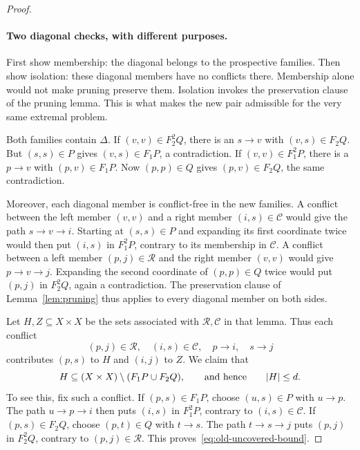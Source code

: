 \begin{proof}
\paragraph{Two diagonal checks, with different purposes.}
First show membership: the diagonal belongs to the prospective families.
Then show isolation: these diagonal members have no conflicts there.
Membership alone would not make pruning preserve them. Isolation invokes
the preservation clause of the pruning lemma. This is what makes the new
pair admissible for the very same extremal problem.

Both families contain $\Delta$.  If $(v,v)\in F_2^2Q$, there is an $s\to v$
with $(v,s)\in F_2Q$.  But $(s,s)\in P$ gives $(v,s)\in F_1P$, a
contradiction.  If $(v,v)\in F_1^2P$, there is a $p\to v$ with
$(p,v)\in F_1P$.  Now $(p,p)\in Q$ gives $(p,v)\in F_2Q$, the same
contradiction.

Moreover, each diagonal member is conflict-free in the new families.
A conflict between the left member $(v,v)$ and a right member
$(i,s)\in\mathcal C$ would give the path $s\to v\to i$.
Starting at $(s,s)\in P$ and expanding its first coordinate twice would
then put $(i,s)$ in $F_1^2P$, contrary to its membership in $\mathcal C$.
A conflict between a left member $(p,j)\in\mathcal R$ and the right member
$(v,v)$ would give $p\to v\to j$.  Expanding the second coordinate of
$(p,p)\in Q$ twice would put $(p,j)$ in $F_2^2Q$, again a contradiction.
The preservation clause of Lemma~\ref{lem:pruning} thus applies to every
diagonal member on both sides.

Let $H,Z\subseteq X\times X$ be the sets associated with
$\mathcal R,\mathcal C$ in that lemma.  Thus each conflict
\[
 (p,j)\in\mathcal R,\quad (i,s)\in\mathcal C,\quad
 p\to i,\quad s\to j
\]
contributes $(p,s)$ to $H$ and $(i,j)$ to $Z$.
We claim that
\begin{equation}\label{eq:old-uncovered-bound}
 H\subseteq (X\times X)\setminus(F_1P\cup F_2Q),
 \qquad\text{and hence}\qquad \lvert H\rvert\le d.
\end{equation}
To see this, fix such a conflict.  If $(p,s)\in F_1P$, choose
$(u,s)\in P$ with $u\to p$.  The path $u\to p\to i$ then puts
$(i,s)$ in $F_1^2P$, contrary to $(i,s)\in\mathcal C$.
If $(p,s)\in F_2Q$, choose $(p,t)\in Q$ with $t\to s$.
The path $t\to s\to j$ puts $(p,j)$ in $F_2^2Q$, contrary to
$(p,j)\in\mathcal R$.  This proves~\eqref{eq:old-uncovered-bound}.


\end{proof}
